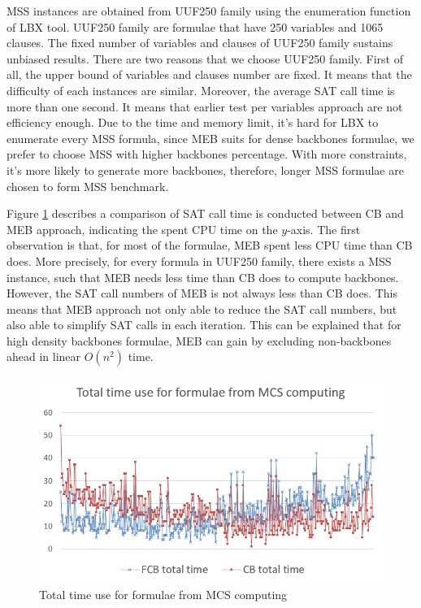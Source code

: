 MSS instances are obtained from UUF250 family using the enumeration function of LBX\cite{MPA2015} tool. UUF250 family are formulae that have 250 variables and 1065 clauses. The fixed number of variables and clauses of UUF250 family sustains unbiased results.
There are two reasons that we choose UUF250 family. First of all, the upper bound of variables and clauses number are fixed. It means that the difficulty of each instances are similar. Moreover, the average SAT call time is more than one second. It means that earlier test per variables approach are not efficiency enough.
Due to the time and memory limit, it's hard for LBX to enumerate every MSS formula, since MEB suits for dense backbones formulae, we prefer to choose MSS with higher backbones percentage. With more constraints, it's more likely to generate more backbones, therefore, longer MSS formulae are chosen to form MSS benchmark.

Figure \ref{fig:mcs-time} describes a comparison of SAT call time is conducted between CB and MEB approach, indicating the spent CPU time on the $y$-axis. The first observation is that, for most of the formulae, MEB spent less CPU time than CB does. More precisely, for every formula in UUF250 family, there exists a MSS instance, such that MEB needs less time than CB does to compute backbones. However, the SAT call numbers of MEB is not always less than CB does. This means that MEB approach not only able to reduce the SAT call numbers, but also able to simplify SAT calls in each iteration. This can be explained that for high density backbones formulae, MEB can gain by excluding non-backbones ahead in linear $O(n^2)$ time.

\begin{figure}
    \centering
    \includegraphics[scale=0.3]{mcs-time.png}
   \caption{Total time use for formulae from MCS computing}
   \label{fig:mcs-time}
\end{figure}

